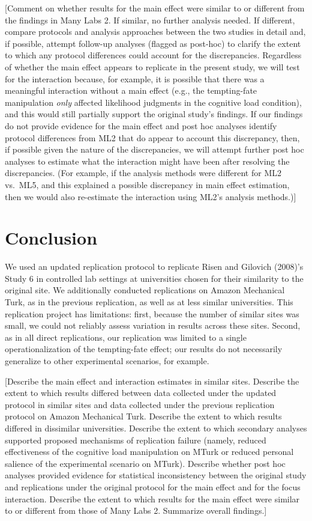 \documentclass[english,floatsintext,man]{apa6}
\theoremstyle{definition}
\theoremstyle{definition}
\theoremstyle{definition}
\theoremstyle{remark}
\begin{document}
{[}Comment on whether results for the main effect were similar to or
different from the findings in Many Labs 2. If similar, no further
analysis needed. If different, compare protocols and analysis approaches
between the two studies in detail and, if possible, attempt follow-up
analyses (flagged as post-hoc) to clarify the extent to which any
protocol differences could account for the discrepancies. Regardless of
whether the main effect appears to replicate in the present study, we
will test for the interaction because, for example, it is possible that
there was a meaningful interaction without a main effect (e.g., the
tempting-fate manipulation \emph{only} affected likelihood judgments in
the cognitive load condition), and this would still partially support
the original study's findings. If our findings do not provide evidence
for the main effect and post hoc analyses identify protocol differences
from ML2 that do appear to account this discrepancy, then, if possible
given the nature of the discrepancies, we will attempt further post hoc
analyses to estimate what the interaction might have been after
resolving the discrepancies. (For example, if the analysis methods were
different for ML2 vs.~ML5, and this explained a possible discrepancy in
main effect estimation, then we would also re-estimate the interaction
using ML2's analysis methods.){]}

\section{Conclusion}\label{conclusion}

We used an updated replication protocol to replicate Risen and Gilovich
(2008)'s Study 6 in controlled lab settings at universities chosen for
their similarity to the original site. We additionally conducted
replications on Amazon Mechanical Turk, as in the previous replication,
as well as at less similar universities. This replication project has
limitations: first, because the number of similar sites was small, we
could not reliably assess variation in results across these sites.
Second, as in all direct replications, our replication was limited to a
single operationalization of the tempting-fate effect; our results do
not necessarily generalize to other experimental scenarios, for example.

{[}Describe the main effect and interaction estimates in similar sites.
Describe the extent to which results differed between data collected
under the updated protocol in similar sites and data collected under the
previous replication protocol on Amazon Mechanical Turk. Describe the
extent to which results differed in dissimilar universities. Describe
the extent to which secondary analyses supported proposed mechanisms of
replication failure (namely, reduced effectiveness of the cognitive load
manipulation on MTurk or reduced personal salience of the experimental
scenario on MTurk). Describe whether post hoc analyses provided evidence
for statistical inconsistency between the original study and
replications under the original protocol for the main effect and for the
focus interaction. Describe the extent to which results for the main
effect were similar to or different from those of Many Labs 2. Summarize
overall findings.{]}
\end{document}
